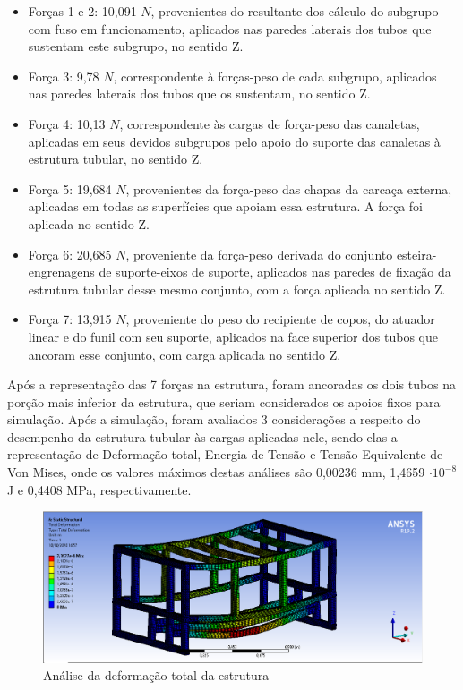 \begin{itemize}
    \item Forças 1 e 2: 10,091 $N$, provenientes do resultante dos cálculo do subgrupo com fuso em funcionamento, aplicados nas paredes laterais dos tubos que sustentam este subgrupo, no sentido Z.
    \item Força 3: 9,78 $N$, correspondente à forças-peso de cada subgrupo, aplicados nas paredes laterais dos tubos que os sustentam, no sentido Z.
    \item Força 4: 10,13 $N$, correspondente às cargas de força-peso das canaletas, aplicadas em seus devidos subgrupos pelo apoio do suporte das canaletas à estrutura tubular, no sentido Z.
    \item Força 5: 19,684 $N$, provenientes da força-peso das chapas da carcaça externa, aplicadas em todas as superfícies que apoiam essa estrutura. A força foi aplicada no sentido Z.
    \item Força 6: 20,685 $N$, proveniente da força-peso derivada do conjunto esteira-engrenagens de suporte-eixos de suporte, aplicados nas paredes de fixação da estrutura tubular desse mesmo conjunto, com a força aplicada no sentido Z.
    \item Força 7: 13,915 $N$, proveniente do peso do recipiente de copos, do atuador linear e do funil com seu suporte, aplicados na face superior dos tubos que ancoram esse conjunto, com carga aplicada no sentido Z.
\end{itemize}

Após a representação das 7 forças na estrutura, foram ancoradas os dois tubos na porção mais inferior da estrutura, que seriam considerados os apoios fixos para simulação.
Após a simulação, foram avaliados 3 considerações a respeito do desempenho da estrutura tubular às cargas aplicadas nele, sendo elas a representação de Deformação total, Energia de Tensão e Tensão Equivalente de Von Mises, onde os valores máximos destas análises são 0,00236 mm, 1,4659 $\cdot 10^{-8}$J e 0,4408 MPa, respectivamente.

\begin{figure}[ht]
    \centering
    \includegraphics[width=1\textwidth]{figuras/estrutura/AnaliseEstaticaTubular/Deformation_Tubular.png}
    \caption{Análise da deformação total da estrutura }
    \label{fig:deformation_tubular}
\end{figure}

